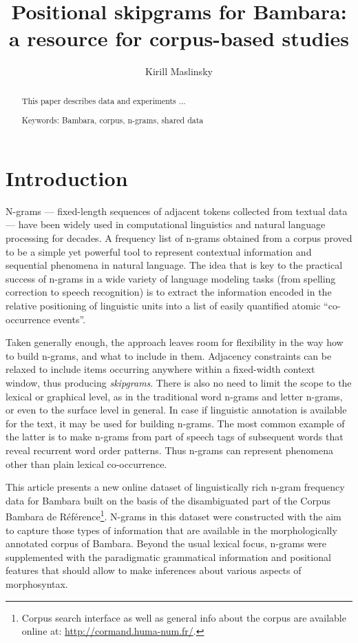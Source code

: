 \documentclass[12pt]{article}
\author{Kirill Maslinsky}
\title{Positional skipgrams for Bambara: a resource for corpus-based studies}
\begin{document}
\maketitle

\begin{abstract}
  This paper describes data and experiments ...


  Keywords: Bambara, corpus, n-grams, shared data
\end{abstract}

\section{Introduction}

N-grams — fixed-length sequences of adjacent tokens collected from
textual data — have been widely used in computational linguistics and
natural language processing for decades. A frequency list of n-grams
obtained from a corpus proved to be a simple yet powerful tool to
represent contextual information and sequential phenomena in natural
language.  The idea that is key to the practical success of n-grams in
a wide variety of language modeling tasks (from spelling correction to
speech recognition) is to extract the information encoded in the relative
positioning of linguistic units into a list of easily quantified
atomic “co-occurrence events”.

Taken generally enough, the approach leaves room for flexibility in
the way how to build n-grams, and what to include in them. Adjacency
constraints can be relaxed to include items occurring anywhere within
a fixed-width context window, thus producing \textit{skipgrams}. There
is also no need to limit the scope to the lexical or graphical level,
as in the traditional word n-grams and letter n-grams, or even to the
surface level in general. In case if linguistic annotation is
available for the text, it may be used for building n-grams. The most
common example of the latter is to make n-grams from part of speech
tags of subsequent words that reveal recurrent word order patterns.
Thus n-grams can represent phenomena other than plain lexical
co-occurrence.

This article presents a new online dataset of linguistically rich
n-gram frequency data for Bambara built on the basis of the
disambiguated part of the Corpus Bambara de
R\'ef\'erence\footnote{Corpus search interface as well as general info
  about the corpus are available online at:
  \url{http://cormand.huma-num.fr/}.}. N-grams in this
dataset were constructed with the aim to capture those types of
information that are available in the morphologically annotated corpus
of Bambara.  Beyond the usual lexical focus, n-grams were supplemented
with the paradigmatic grammatical information and positional
features that should allow to make inferences about
various aspects of morphosyntax. %
\end{document}
